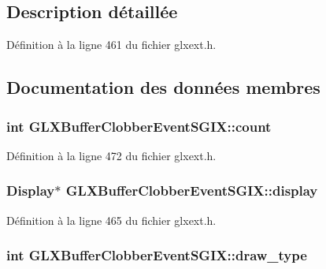 \subsection{Description détaillée}


Définition à la ligne 461 du fichier glxext.\-h.



\subsection{Documentation des données membres}
\hypertarget{struct_g_l_x_buffer_clobber_event_s_g_i_x_ad8f4f0aae058e0a1ff542679823e37a9}{
\subsubsection[{count}]{\setlength{\rightskip}{0pt plus 5cm}int G\-L\-X\-Buffer\-Clobber\-Event\-S\-G\-I\-X\-::count}}\label{struct_g_l_x_buffer_clobber_event_s_g_i_x_ad8f4f0aae058e0a1ff542679823e37a9}


Définition à la ligne 472 du fichier glxext.\-h.

\hypertarget{struct_g_l_x_buffer_clobber_event_s_g_i_x_afef060d81026da75c846727f4a3de9d4}{
\subsubsection[{display}]{\setlength{\rightskip}{0pt plus 5cm}Display$\ast$ G\-L\-X\-Buffer\-Clobber\-Event\-S\-G\-I\-X\-::display}}\label{struct_g_l_x_buffer_clobber_event_s_g_i_x_afef060d81026da75c846727f4a3de9d4}


Définition à la ligne 465 du fichier glxext.\-h.

\hypertarget{struct_g_l_x_buffer_clobber_event_s_g_i_x_a25c31e8cbec0919f74a1e93ae74175b1}{
\subsubsection[{draw\-\_\-type}]{\setlength{\rightskip}{0pt plus 5cm}int G\-L\-X\-Buffer\-Clobber\-Event\-S\-G\-I\-X\-::draw\-\_\-type}}\label{struct_g_l_x_buffer_clobber_event_s_g_i_x_a25c31e8cbec0919f74a1e93ae74175b1}


